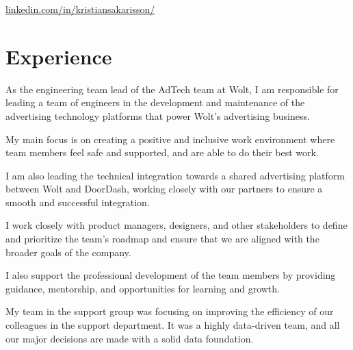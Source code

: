 \documentclass[]{deedy-resume-openfont}
\begin{document}

\href{https://www.linkedin.com/in/kristiansakarisson/}{linkedin.com/in/kristiansakarisson/}

\section{Experience}

\begin{tightemize}
\item As the engineering team lead of the AdTech team at Wolt, I am responsible for leading a team of engineers in the development and maintenance of the advertising technology platforms that power Wolt's advertising business.
\item My main focus is on creating a positive and inclusive work environment where team members feel safe and supported, and are able to do their best work.
\item I am also leading the technical integration towards a shared advertising platform between Wolt and DoorDash, working closely with our partners to ensure a smooth and successful integration.
\item I work closely with product managers, designers, and other stakeholders to define and prioritize the team's roadmap and ensure that we are aligned with the broader goals of the company.
\item I also support the professional development of the team members by providing guidance, mentorship, and opportunities for learning and growth.
\end{tightemize}

\sectionsep

\begin{tightemize}
\item My team in the support group was focusing on improving the efficiency of our colleagues in the support department. It was a highly data-driven team, and all our major decisions are made with a solid data foundation.
\end{tightemize}
\sectionsep
\end{document}
